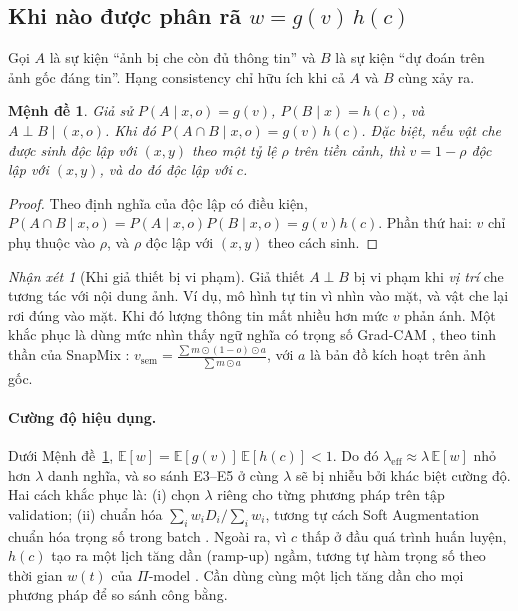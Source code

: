 \documentclass[11pt,a4paper]{article}
\theoremstyle{plain}
\newtheorem{proposition}{Mệnh đề}
\theoremstyle{definition}
\theoremstyle{remark}
\newtheorem{remark}{Nhận xét}
\newcommand{\E}{\mathbb{E}}
\begin{document}
\subsection{Khi nào được phân rã $w=g(v)\,h(c)$}
\label{sec:factor}

Gọi $A$ là sự kiện ``ảnh bị che còn đủ thông tin'' và $B$ là sự kiện ``dự đoán trên ảnh gốc đáng tin''. Hạng consistency chỉ hữu ích khi cả $A$ và $B$ cùng xảy ra.

\begin{proposition}
\label{prop:factor}
Giả sử $P(A\mid x,o)=g(v)$, $P(B\mid x)=h(c)$, và $A\perp B\mid(x,o)$. Khi đó $P(A\cap B\mid x,o)=g(v)\,h(c)$. Đặc biệt, nếu vật che được sinh độc lập với $(x,y)$ theo một tỷ lệ $\rho$ trên tiền cảnh, thì $v=1-\rho$ độc lập với $(x,y)$, và do đó độc lập với $c$.
\end{proposition}
\begin{proof}
Theo định nghĩa của độc lập có điều kiện, $P(A\cap B\mid x,o)=P(A\mid x,o)P(B\mid x,o)=g(v)h(c)$. Phần thứ hai: $v$ chỉ phụ thuộc vào $\rho$, và $\rho$ độc lập với $(x,y)$ theo cách sinh.
\end{proof}

\begin{remark}[Khi giả thiết bị vi phạm]
Giả thiết $A\perp B$ bị vi phạm khi \emph{vị trí} che tương tác với nội dung ảnh. Ví dụ, mô hình tự tin vì nhìn vào mặt, và vật che lại rơi đúng vào mặt. Khi đó lượng thông tin mất nhiều hơn mức $v$ phản ánh. Một khắc phục là dùng mức nhìn thấy ngữ nghĩa có trọng số Grad-CAM \cite{selvaraju2017gradcam}, theo tinh thần của SnapMix \cite{huang2021snapmix}:
\(
  v_{\mathrm{sem}}=\frac{\sum m\odot(1-o)\odot a}{\sum m\odot a}
\),
với $a$ là bản đồ kích hoạt trên ảnh gốc.
\end{remark}

\paragraph{Cường độ hiệu dụng.} Dưới Mệnh đề~\ref{prop:factor}, $\E[w]=\E[g(v)]\,\E[h(c)]<1$. Do đó $\lambda_{\mathrm{eff}}\approx\lambda\,\E[w]$ nhỏ hơn $\lambda$ danh nghĩa, và so sánh E3--E5 ở cùng $\lambda$ sẽ bị nhiễu bởi khác biệt cường độ. Hai cách khắc phục là: (i) chọn $\lambda$ riêng cho từng phương pháp trên tập validation; (ii) chuẩn hóa $\sum_i w_i D_i/\sum_i w_i$, tương tự cách Soft Augmentation chuẩn hóa trọng số trong batch \cite{liu2023soft}. Ngoài ra, vì $c$ thấp ở đầu quá trình huấn luyện, $h(c)$ tạo ra một lịch tăng dần (ramp-up) ngầm, tương tự hàm trọng số theo thời gian $w(t)$ của $\Pi$-model \cite{laine2017temporal}. Cần dùng cùng một lịch tăng dần cho mọi phương pháp để so sánh công bằng.
\end{document}
